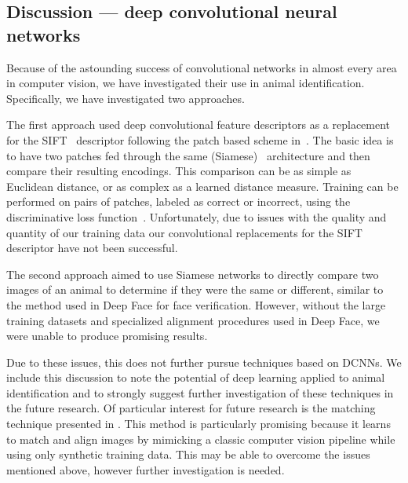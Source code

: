  \subsection{Discussion --- deep convolutional neural networks}\label{subsec:dcnndiscuss}
        Because of the astounding success of convolutional networks in almost every area in computer vision, we have
        investigated their use in animal identification. Specifically, we have investigated two approaches.

        The first approach used deep convolutional feature descriptors as a replacement for the
        SIFT~\cite{lowe_distinctive_2004} descriptor following the patch based scheme in~\cite{zagoruyko_learning_2015}.
        The basic idea is to have two patches fed through the same (Siamese)~\cite{chopra_learning_2005} architecture
        and then compare their resulting encodings. This comparison can be as simple as Euclidean distance, or as
        complex as a learned distance measure. Training can be performed on pairs of patches, labeled as correct or
        incorrect, using the discriminative loss function~\cite{lecun_loss_2005}. Unfortunately, due to issues with the
        quality and quantity of our training data our convolutional replacements for the SIFT descriptor have not been
        successful.

        The second approach aimed to use Siamese networks to directly compare two images of an animal to determine if
        they were the same or different, similar to the method used in Deep Face\cite{taigman_deepface_2014} for face
        verification. However, without the large training datasets and specialized alignment procedures used in Deep
        Face, we were unable to produce promising results.
        
        Due to these issues, this \thesis{} does not further pursue techniques based on DCNNs. We include this
        discussion to note the potential of deep learning applied to animal identification and to strongly suggest
        further investigation of these techniques in the future research. Of particular interest for future
        research is the matching technique presented in \cite{rocco_convolutional_2017}. This method is
        particularly promising because it learns to match and align images by mimicking a classic computer vision
        pipeline while using only synthetic training data. This may be able to overcome the issues mentioned above,
        however further investigation is needed.

